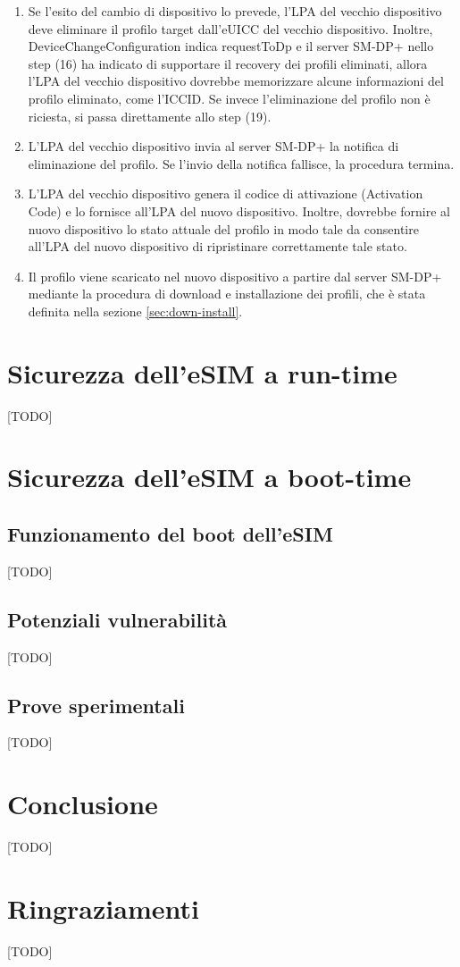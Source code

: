 \documentclass[10pt, twoside, openany]{book}
\begin{document}
\begin{enumerate}
\item Se l'esito del cambio di dispositivo lo prevede, l'LPA del vecchio dispositivo deve eliminare il profilo target dall'eUICC del vecchio dispositivo. Inoltre, DeviceChangeConfiguration indica requestToDp e il server SM-DP+ nello step (16) ha indicato di supportare il recovery dei profili eliminati, allora l'LPA del vecchio dispositivo dovrebbe memorizzare alcune informazioni del profilo eliminato, come l'ICCID. Se invece l'eliminazione del profilo non è riciesta, si passa direttamente allo step (19).
\item L'LPA del vecchio dispositivo invia al server SM-DP+ la notifica di eliminazione del profilo. Se l'invio della notifica fallisce, la procedura termina.
\item L'LPA del vecchio dispositivo genera il codice di attivazione (Activation Code) e lo fornisce all'LPA del nuovo dispositivo. Inoltre, dovrebbe fornire al nuovo dispositivo lo stato attuale del profilo in modo tale da consentire all'LPA del nuovo dispositivo di ripristinare correttamente tale stato.
\item Il profilo viene scaricato nel nuovo dispositivo a partire dal server SM-DP+ mediante la procedura di download e installazione dei profili, che è stata definita nella sezione \ref{sec:down-install}.
\end{enumerate}

\chapter{Sicurezza dell'eSIM a run-time}
[TODO]

\chapter{Sicurezza dell'eSIM a boot-time}
\section{Funzionamento del boot dell'eSIM}
[TODO]

\section{Potenziali vulnerabilità}
[TODO]

\section{Prove sperimentali}
[TODO]

\chapter{Conclusione}
[TODO]



\chapter*{Ringraziamenti}
[TODO]
\end{document}
